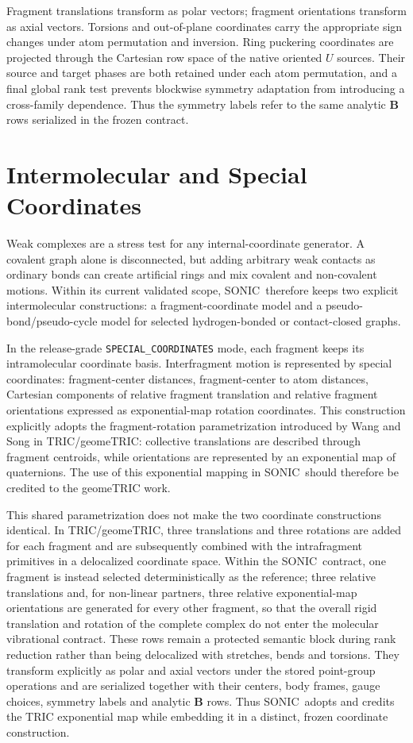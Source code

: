 \documentclass[journal=jctcce,manuscript=article,layout=traditional]{achemso}
\newcommand{\SONIC}{SONIC}
\newcommand{\Bmat}{\mathbf{B}}
\theoremstyle{definition}
\begin{document}
Fragment translations transform as polar vectors; fragment orientations
transform as axial vectors.  Torsions and out-of-plane coordinates carry the
appropriate sign changes under atom permutation and inversion.  Ring puckering
coordinates are projected through the Cartesian row space of the native
oriented \(U\) sources.  Their source and target phases are both retained under
each atom permutation, and a final global rank test prevents blockwise
symmetry adaptation from introducing a cross-family dependence.  Thus the
symmetry labels refer to the same analytic \(\Bmat\) rows serialized in the
frozen contract.

\section{Intermolecular and Special Coordinates}

Weak complexes are a stress test for any internal-coordinate generator.  A
covalent graph alone is disconnected, but adding arbitrary weak contacts as
ordinary bonds can create artificial rings and mix covalent and non-covalent
motions.  Within its current validated scope, \SONIC\ therefore keeps two
explicit intermolecular constructions: a fragment-coordinate model
and a pseudo-bond/pseudo-cycle model for selected hydrogen-bonded or
contact-closed graphs.

In the release-grade \texttt{SPECIAL\_COORDINATES} mode, each fragment keeps its
intramolecular coordinate basis.  Interfragment motion is represented by
special coordinates: fragment-center distances, fragment-center to
atom distances, Cartesian components of relative fragment translation and
relative fragment orientations expressed as exponential-map rotation
coordinates.  This construction explicitly adopts the fragment-rotation
parametrization introduced by Wang and Song in TRIC/geomeTRIC: collective
translations are described through fragment centroids, while orientations are
represented by an exponential map of quaternions.\cite{WangSong2016GeomeTRIC}
The use of this exponential mapping in \SONIC\ should therefore be credited to
the geomeTRIC work.

This shared parametrization does not make the two coordinate constructions
identical.  In TRIC/geomeTRIC, three translations and three rotations are added
for each fragment and are subsequently combined with the intrafragment
primitives in a delocalized coordinate space.\cite{WangSong2016GeomeTRIC}
Within the \SONIC\ contract, one fragment is instead selected deterministically
as the reference; three relative translations and, for non-linear partners,
three relative exponential-map orientations are generated for every other
fragment, so that the overall rigid translation and rotation of the complete
complex do not enter the molecular vibrational contract.  These rows remain a
protected semantic block during rank reduction rather than being delocalized
with stretches, bends and torsions.  They transform explicitly as polar and
axial vectors under the stored point-group operations and are serialized
together with their centers, body frames, gauge choices, symmetry labels and
analytic \(\Bmat\) rows.  Thus \SONIC\ adopts and credits the TRIC exponential
map while embedding it in a distinct, frozen coordinate construction.
\end{document}
